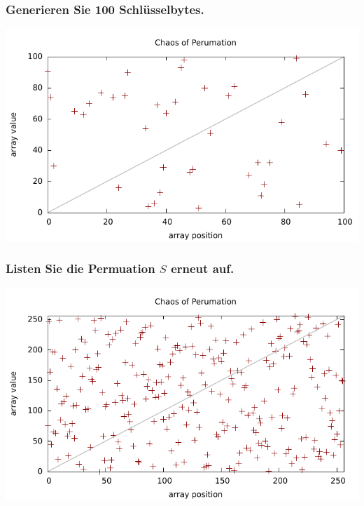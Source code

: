 \subsubsection{Generieren Sie 100 Schlüsselbytes.}
\includegraphics[width=\textwidth]{eclipse/rc4-key-seq.pdf}

\subsubsection{Listen Sie die Permuation $S$ erneut auf.}
\includegraphics[width=\textwidth]{eclipse/afterrc4.pdf}